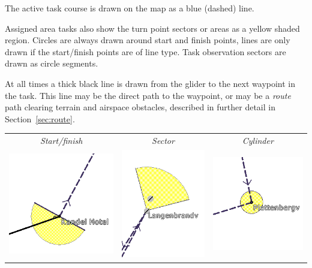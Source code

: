 The active task course is drawn on the map as a blue (dashed) line.

Assigned area tasks also show the turn point sectors or areas as a yellow shaded
region.  Circles are always drawn around start and finish points, lines are
only drawn if the start/finish points are of line type.  
Task observation sectors are drawn as circle segments.

At all times a thick black line is drawn from the glider to the next
waypoint in the task.  This line may be the direct path to the waypoint,
or may be a \emph{route} path clearing terrain and airspace obstacles, described in
further detail in Section~\ref{sec:route}.

\begin{center}
\begin{tabular}{c c c}
\emph{Start/finish} & \emph{Sector} & \emph{Cylinder} \\
\includegraphics[angle=0,width=0.3\linewidth,keepaspectratio='true']{figures/cut-startfinish.png} &
\includegraphics[angle=0,width=0.3\linewidth,keepaspectratio='true']{figures/cut-sector.png} &
\includegraphics[angle=0,width=0.3\linewidth,keepaspectratio='true']{figures/cut-barrel.png}
\end{tabular}
\end{center}


